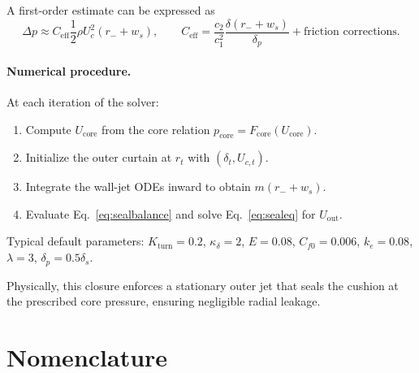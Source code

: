 \documentclass[11pt,a4paper]{article}
\begin{document}
A first-order estimate can be expressed as
\begin{equation}
\Delta p \approx C_{\mathrm{eff}} \frac12 \rho U_c^2(r_-+w_s),
\qquad
C_{\mathrm{eff}} = \frac{c_2}{c_1^2}\frac{\delta(r_-+w_s)}{\delta_p} + \text{friction corrections.}
\end{equation}

\paragraph{Numerical procedure.}
At each iteration of the solver:
\begin{enumerate}
  \item Compute $U_{\mathrm{core}}$ from the core relation
  $p_{\mathrm{core}} = F_{\mathrm{core}}(U_{\mathrm{core}})$.
  \item Initialize the outer curtain at $r_t$ with $(\delta_t, U_{c,t})$.
  \item Integrate the wall-jet ODEs inward to obtain $m(r_-+w_s)$.
  \item Evaluate Eq.~\eqref{eq:sealbalance} and solve Eq.~\eqref{eq:sealeq} for $U_{\mathrm{out}}$.
\end{enumerate}
Typical default parameters: $K_{\mathrm{turn}}=0.2$, $\kappa_\delta=2$,
$E=0.08$, $C_{f0}=0.006$, $k_e=0.08$, $\lambda=3$, $\delta_p=0.5\delta_s$.

Physically, this closure enforces a stationary outer jet that seals the cushion
at the prescribed core pressure, ensuring negligible radial leakage.
\section{Nomenclature}
\label{sec:nomenclature}
\end{document}
